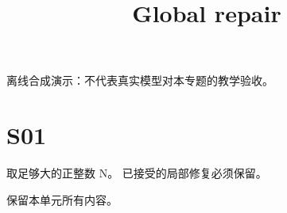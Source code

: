 \documentclass[UTF8,fontset=fandol,11pt]{ctexart}
\title{Global repair}
\date{}
\begin{document}
\maketitle
\par\noindent 离线合成演示：不代表真实模型对本专题的教学验收。\par
\section{S01}\label{sec:S01}
取足够大的正整数 N。 已接受的局部修复必须保留。\par
保留本单元所有内容。\par
\end{document}
